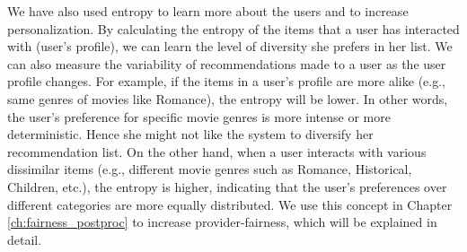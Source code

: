             We have also used entropy to learn more about the users and to increase personalization. By calculating the entropy of the items that a user has interacted with (user's profile), we can learn the level of diversity she prefers in her list. We can also measure the variability of recommendations made to a user as the user profile changes. For example, if the items in a user's profile are more alike (e.g., same genres of movies like Romance), the entropy will be lower. In other words, the user's preference for specific movie genres is more intense or more deterministic. Hence she might not like the system to diversify her recommendation list. On the other hand, when a user interacts with various dissimilar items (e.g., different movie genres such as Romance, Historical, Children, etc.), the entropy is higher, indicating that the user's preferences over different categories are more equally distributed. We use this concept in Chapter \ref{ch:fairness_postproc} to increase provider-fairness, which will be explained in detail.
        
            
        
        
    
            
            
            


